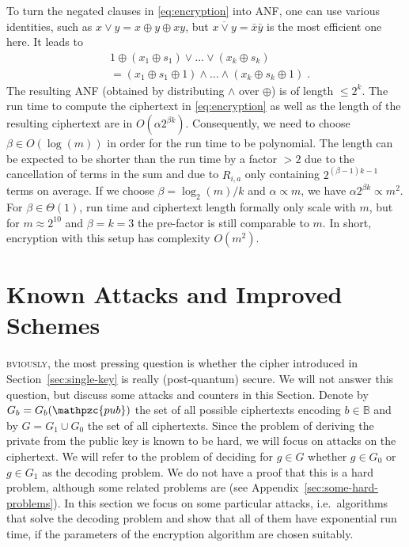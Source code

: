 \documentclass[final,journal,compsoc]{IEEEtran}
\newcommand{\pub}{\mathpzc{pub}}
\begin{document}
To turn the negated clauses in \eqref{eq:encryption} into ANF, one can
use various identities, such as $x\vee y = x \oplus y \oplus xy$, but
$\overline{x\vee y} = \bar x \bar y$ is the most efficient one here. It
leads to
\begin{subequations}
 \label{eq:ANFclause}
 \begin{align}
&1 \oplus (x_1 \oplus s_1) \vee \ldots \vee (x_k \oplus s_k) \\
 & =  (x_1 \oplus s_1 \oplus 1) \wedge \ldots \wedge (x_k \oplus
 s_k \oplus 1) \;.
 \end{align}
\end{subequations}
The resulting ANF (obtained by distributing $\wedge$ over $\oplus$) is
of length $ \leq 2^k$. 
The run time to compute the ciphertext in \eqref{eq:encryption}
as well as the length of the resulting ciphertext are in $O(\alpha
2^{\beta k})$. 
Consequently, we need
to choose $\beta \in O(\log(m))$ in order for the run time to be
polynomial.
 The length can be expected to be shorter than the run
time by a factor $>2$ due to the cancellation of terms in the sum and
due to $R_{i,a}$ only
containing $2^{(\beta-1)k-1}$ terms on average.   
If we choose $\beta = \log_2(m)/k$ and $\alpha \propto m$, we
have $\alpha 2^{\beta k} \propto m^2$. For $\beta \in \Theta(1)$, run
time and ciphertext length formally only scale with $m$, but for $m\approx 2^{10}$
and $\beta=k=3$ the pre-factor is still comparable to $m$.
In short, encryption with this setup has complexity $O(m^2)$.


\section{Known Attacks and Improved Schemes\label{sec:known-attacks-impr}}

\textsc{bviously}, the most pressing question is whether
the cipher introduced in Section~\ref{sec:single-key} is really
(post-quantum) secure. We will not answer this question, but discuss
some attacks and counters in this Section.
Denote by $G_b =G_b(\pub)$ the set of all possible ciphertexts encoding
$b\in\mathbb B$ and by $G=G_1\cup G_0$ the set of all ciphertexts.
Since the problem of deriving the private from the public key is known
to be hard, we will focus on attacks on the ciphertext. We will refer to
the problem of deciding for $g\in G$ whether $g\in G_0$ or $g\in
G_1$ as the decoding problem. We do not have a proof that this is a
hard problem, although some
related problems are (see Appendix~\ref{sec:some-hard-problems}). In
this section we focus on some particular attacks, i.e.\ algorithms
that solve the decoding problem and show that all of them have
exponential run time, if the parameters of the encryption algorithm
are chosen suitably.
\end{document}
